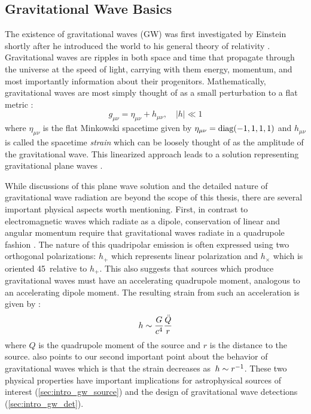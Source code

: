 \subsection{Gravitational Wave Basics}
\label{sec:intro_gw_basics}
The existence of gravitational waves (GW) was first investigated by Einstein shortly after he introduced the world to his general theory of relativity \citep{Einstein1915,Einstein1916,Einstein1918}. Gravitational waves are ripples in both space and time that propagate through the universe at the speed of light, carrying with them energy, momentum, and most importantly information about their progenitors. Mathematically, gravitational waves are most simply thought of as a small perturbation to a flat metric \citep[$g_{\mu\nu}$; ][]{Misner+73,Carroll2004}:
\begin{equation}
\label{eq:intro_metric}
g_{\mu\nu} = \eta_{\mu\nu} + h_{\mu\nu}, \quad |h| \ll 1
\end{equation}
\noindent where $\eta_{\mu\nu}$ is the flat Minkowski spacetime given by $\eta_{\mu\nu} = {\rm diag}(-1, 1,1,1)$ and $h_{\mu\nu}$ is called the spacetime {\em strain} which can be loosely thought of as the amplitude of the gravitational wave. This linearized approach leads to a solution representing gravitational plane waves \citep[see e.g.,][and references therein]{Misner+73,Carroll2004}.

While discussions of this plane wave solution and the detailed nature of gravitational wave radiation are beyond the scope of this thesis, there are several important physical aspects worth mentioning. First, in contrast to electromagnetic waves which radiate as a dipole, conservation of linear and angular momentum require that gravitational waves radiate in a quadrupole fashion \citep[see e.g.,][and references therein]{Centrella+10}. The nature of this quadripolar emission is often expressed using two orthogonal polarizations: $h_{+}$ which represents linear polarization and $h_{\times}$ which is oriented 45\degr~relative to $h_{+}$. This also suggests that sources which produce gravitational waves must have an accelerating quadrupole moment, analogous to an accelerating dipole moment. The resulting strain from such an acceleration is given by \citep{Centrella+10}:
\begin{equation}
\label{eq:intro_quad}
h \apx \frac{G}{c^4} \frac{\ddot{Q}}{r}
\end{equation}
\noindent where $Q$ is the quadrupole moment of the source and $r$ is the distance to the source.  also points to our second important point about the behavior of gravitational waves which is that the strain decreases as~$h \sim r^{-1}$. These two physical properties have important implications for astrophysical sources of interest (\cref{sec:intro_gw_source}) and the design of gravitational wave detections (\cref{sec:intro_gw_det}).

